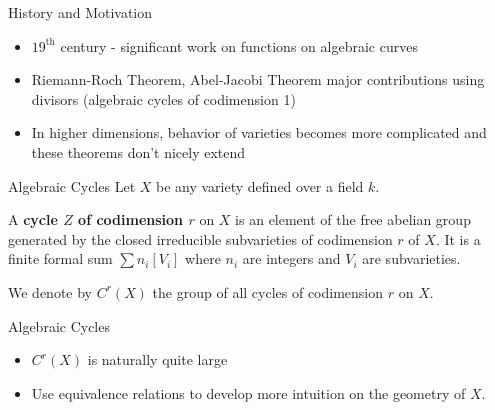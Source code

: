 




\frame{\titlepage}

\begin{frame}{History and Motivation}
  \pause
  \begin{itemize}
    \item $19^{\text{th}}$ century - significant work on functions on algebraic curves \pause
    \item Riemann-Roch Theorem, Abel-Jacobi Theorem major contributions using divisors (algebraic cycles of
      codimension 1) \pause
    \item In higher dimensions, behavior of varieties becomes more complicated and these theorems don't
      nicely extend
  \end{itemize}
\end{frame}

\begin{frame}{Algebraic Cycles}
  \pause
  Let $X$ be any variety defined over a field $k$.\pause
  \begin{definition}
    A \textbf{cycle $Z$ of codimension $r$} on $X$ is an element of the free abelian group generated
    by the closed irreducible subvarieties of codimension $r$ of $X$. It is a finite formal sum $\sum n_i [V_i]$ where
    $n_i$ are integers and $V_i$ are subvarieties. 
  \end{definition}\pause
  We denote by $C^r(X)$ the group of all cycles of codimension $r$ on $X$.
\end{frame}

\begin{frame}{Algebraic Cycles}
  \begin{itemize}
    \item $C^r(X)$ is naturally quite large \pause
    \item Use equivalence relations to develop more intuition on the geometry of $X$.
  \end{itemize}
\end{frame}

